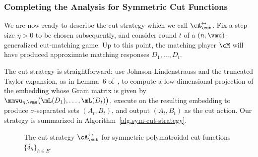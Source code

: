 \documentclass[letterpaper]{article}
\begin{document}
\subsubsection{Completing the Analysis for Symmetric Cut Functions}

We are now ready to describe the cut strategy which we call $\cA^{\leftrightarrow}_{\cut}$. Fix a step size $\eta > 0$ to be chosen subsequently, and consider round $t$ of a $(n,\vmu)$-generalized cut-matching game. Up to this point, the matching player $\cM$ will have produced approximate matching responses $D_1, \ldots, D_t$.

The cut strategy is straightforward: use Johnson-Lindenstrauss and the truncated Taylor expansion, as in Lemma~6 of~\cite{arora2007combinatorial}, to compute a low-dimensional projection of the embedding whose Gram matrix is given by $\mmwu_{\eta, \vmu}\big( \mL(D_1), \ldots, \mL(D_t) \big)$, execute \roundcut on the resulting embedding to produce $\sigma$-separated sets $(A_t, B_t)$, and output $(A_t, B_t)$ as the cut action. Our strategy is summarized in Algorithm~\ref{alg.sym-cut-strategy}.

\begin{figure}[h]
\centering
\noindent{}

\caption{The cut strategy $\cA_{\cut}^{\leftrightarrow}$ for symmetric polymatroidal cut functions $\{ \delta_h \}_{h \in E}$.}
\end{figure}
\end{document}
